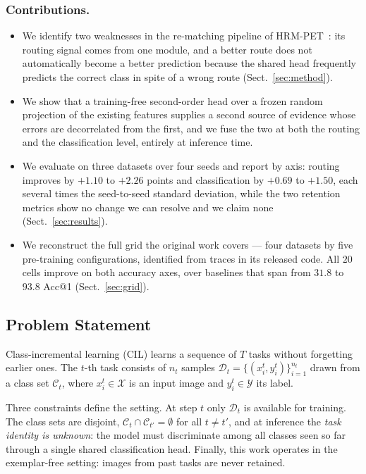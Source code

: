 \documentclass[runningheads]{llncs}
\begin{document}
\subsubsection{Contributions.}
\begin{itemize}
\item We identify two weaknesses in the re-matching pipeline of
      HRM-PET~\cite{ref_hrmpet}: its routing signal comes from one module, and a
      better route does not automatically become a better prediction because the
      shared head frequently predicts the correct class in spite of a wrong
      route (Sect.~\ref{sec:method}).
\item We show that a training-free second-order head over a frozen random
      projection of the existing features supplies a second source of evidence
      whose errors are decorrelated from the first, and we fuse the two at both
      the routing and the classification level, entirely at inference time.
\item We evaluate on three datasets over four seeds and report by axis: routing
      improves by $+1.10$ to $+2.26$ points and classification by $+0.69$ to
      $+1.50$, each several times the seed-to-seed standard deviation, while the
      two retention metrics show no change we can resolve and we claim none
      (Sect.~\ref{sec:results}).
\item We reconstruct the full grid the original work covers --- four datasets by
      five pre-training configurations, identified from traces in its released
      code. All $20$ cells improve on both accuracy axes, over baselines that
      span from $31.8$ to $93.8$ Acc@1 (Sect.~\ref{sec:grid}).
\end{itemize}

\subsection{Problem Statement}

Class-incremental learning (CIL) learns a sequence of $T$ tasks without
forgetting earlier ones. The $t$-th task consists of $n_t$ samples
$\mathcal{D}_t=\{(x^t_i,y^t_i)\}_{i=1}^{n_t}$ drawn from a class set
$\mathcal{C}_t$, where $x^t_i \in \mathcal{X}$ is an input image and
$y^t_i \in \mathcal{Y}$ its label.

Three constraints define the setting. At step $t$ only $\mathcal{D}_t$ is
available for training. The class sets are disjoint,
$\mathcal{C}_t \cap \mathcal{C}_{t'} = \emptyset$ for all $t \neq t'$, and at
inference the \emph{task identity is unknown}: the model must discriminate among
all classes seen so far through a single shared classification head. Finally,
this work operates in the exemplar-free setting: images from past tasks are
never retained.
\end{document}
